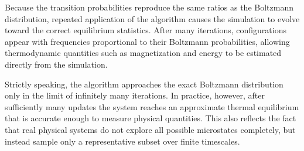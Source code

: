 Because the transition probabilities reproduce the same ratios as the Boltzmann distribution, repeated application of the algorithm causes the simulation to evolve toward the correct equilibrium statistics. After many iterations, configurations appear with frequencies proportional to their Boltzmann probabilities, allowing thermodynamic quantities such as magnetization and energy to be estimated directly from the simulation.

Strictly speaking, the algorithm approaches the exact Boltzmann distribution only in the limit of infinitely many iterations. In practice, however, after sufficiently many updates the system reaches an approximate thermal equilibrium that is accurate enough to measure physical quantities. This also reflects the fact that real physical systems do not explore all possible microstates completely, but instead sample only a representative subset over finite timescales.

